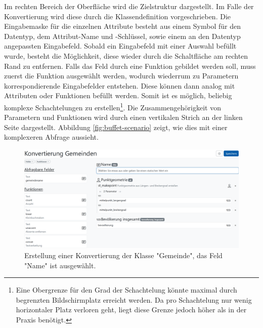 Im rechten Bereich der Oberfläche wird die Zielstruktur dargestellt. Im Falle der Konvertierung wird diese durch die Klassendefinition vorgeschrieben. Die Eingabemaske für die einzelnen Attribute besteht aus einem Symbol für den Datentyp, dem Attribut-Name und -Schlüssel, sowie einem an den Datentyp angepassten Eingabefeld. Sobald ein Eingabefeld mit einer Auswahl befüllt wurde, besteht die Möglichkeit, diese wieder durch die Schaltfläche am rechten Rand zu entfernen. Falls das Feld durch eine Funktion gebildet werden soll, muss zuerst die Funktion ausgewählt werden, wodurch wiederrum zu Parametern korrespondierende Eingabefelder entstehen. Diese können dann analog mit Attributen oder Funktionen befüllt werden. Somit ist es möglich, beliebig komplexe Schachtelungen zu erstellen\footnote{Eine Obergrenze für den Grad der Schachtelung könnte maximal durch begrenzten Bildschirmplatz erreicht werden. Da pro Schachtelung nur wenig horizontaler Platz verloren geht, liegt diese Grenze jedoch höher als in der Praxis benötigt. }. Die Zusammengehörigkeit von Parametern und Funktionen wird durch einen vertikalen Strich an der linken Seite dargestellt. Abbildung \ref{fig:buffet-scenario} zeigt, wie dies mit einer komplexeren Abfrage aussieht.

\begin{figure}[ht]
  \begin{center}
    \includegraphics[width=.95\textwidth]{assets/buffet-selected.png}
  \end{center}
  \caption{Erstellung einer Konvertierung der Klasse "Gemeinde", das Feld "Name" ist ausgewählt.}
  \label{fig:buffet-selected}
\end{figure}

